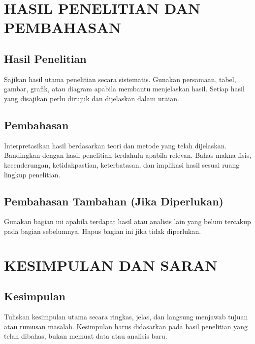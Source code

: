 \documentclass[skripsi]{ugmskripsi}
\begin{document}
\chapter{HASIL PENELITIAN DAN PEMBAHASAN}

\section{Hasil Penelitian}
Sajikan hasil utama penelitian secara sistematis. Gunakan persamaan, tabel,
gambar, grafik, atau diagram apabila membantu menjelaskan hasil. Setiap
hasil yang disajikan perlu dirujuk dan dijelaskan dalam uraian.

\section{Pembahasan}
Interpretasikan hasil berdasarkan teori dan metode yang telah dijelaskan.
Bandingkan dengan hasil penelitian terdahulu apabila relevan. Bahas makna
fisis, kecenderungan, ketidakpastian, keterbatasan, dan implikasi hasil
sesuai ruang lingkup penelitian.

\section{Pembahasan Tambahan (Jika Diperlukan)}
Gunakan bagian ini apabila terdapat hasil atau analisis lain yang belum
tercakup pada bagian sebelumnya. Hapus bagian ini jika tidak diperlukan.

\chapter{KESIMPULAN DAN SARAN}

\section{Kesimpulan}
Tuliskan kesimpulan utama secara ringkas, jelas, dan langsung menjawab tujuan
atau rumusan masalah. Kesimpulan harus didasarkan pada hasil penelitian yang
telah dibahas, bukan memuat data atau analisis baru.
\end{document}
